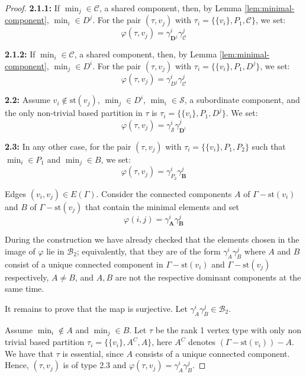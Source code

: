 \documentclass[10pt,a4paper]{amsart}
\newcommand{\B}{\mathcal{B}}
\newcommand{\C}{\mathcal{C}}
\newcommand{\G}{\Gamma}
\newcommand{\s}{\mathcal{S}}
\newcommand{\st}{\mathrm{st}}
\begin{document}
\begin{proof}
{\textbf{2.1.1:}}  If $\min_j\in\C$, a shared component, then, by Lemma \ref{lem:minimal-component},  $\min_i\in D^j$. For the pair $(\tau,v_j)$ with $\tau_i=\{\{v_i\},P_1,\C\}$, we set:
$$
\varphi(\tau,v_j)=\gamma^i_{\boldsymbol{D}^j}\gamma^j_{\boldsymbol{\C}}
$$

{\textbf{2.1.2:}} If $\min_i\in\C$, a shared component, then, by Lemma \ref{lem:minimal-component},  $\min_j\in D^i$. For the pair $(\tau,v_j)$ with $\tau_i=\{\{v_i\},P_1,D^j\}$, we set:
$$
\varphi(\tau,v_j)=\gamma^i_{D^j}\gamma^j_\C
$$

{\textbf{2.2:}} Assume $v_i\notin \st (v_j)$, $\min_j\in D^i$,   $\min_i\in\mathcal{S}$, a subordinate component, and the only non-trivial based partition in $\tau$ is $\tau_i=\{\{v_i\},P_1,D^j\}$. We set:
 $$
    \varphi(\tau,v_j)= \gamma^i_{\boldsymbol{\s}}\gamma^j_{\boldsymbol{D}^i}
    $$

    {\textbf{2.3:}} In any other case, for the pair $(\tau,v_j)$ with $\tau_i=\{\{v_i\},P_1,P_2\}$ such that  $\min_i\in P_1$ and  $\min_j\in B$, we set:
    $$
    \varphi(\tau,v_j)= \gamma^i_{P_2}\gamma^j_{\boldsymbol{B}}
    $$

    
 Edges $(v_i,v_j)\in E(\G)$. Consider the connected components $A$ of $\G-\st(v_i)$ and $B$ of $\G-\st(v_j)$  that contain the minimal elements and set
 $$
    \varphi(i,j)= \gamma^i_{\boldsymbol{A}}\gamma^j_{\boldsymbol{B}}
    $$



During the construction we have already checked that the elements chosen in the image of $\varphi$ lie in $\B_2$; equivalently,  that they are of the form $\gamma^i_{A}\gamma^j_{B}$ where  $A$ and $B$ consist of a unique  connected component in $\G-\st(v_i)$ and $\G-\st(v_j)$ respectively, $A\neq B$, and $A,B$ are not the respective dominant components at the same time. 

It remains to prove that the map is surjective. Let $\gamma^i_{A}\gamma^j_{B}\in\B_2$.



  Assume $\min_i\notin A$ and $\min_j\in B$. Let $\tau$ be the rank 1 vertex type with only non trivial based partition  $\tau_i=\{\{v_i\}, A^C, A\}$, here $A^C$ denotes $(\G-\st(v_i))-A$. We have that $\tau$ is essential, since $A$ consists of a unique connected component. Hence, $(\tau,v_j)$ is of type 2.3 and $\varphi(\tau,v_j)=\gamma^i_{A}\gamma^j_{B}$.


\end{proof}
\end{document}
